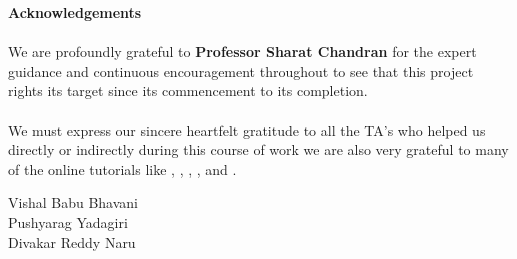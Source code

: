 \begin{center}
\thispagestyle{empty}
\LARGE{\textbf{Acknowledgements}}\\[1cm]
\end{center}
\linespread{1.13}
\large{\paragraph{}We are profoundly grateful to \textbf{Professor Sharat Chandran} for the expert guidance
and continuous encouragement throughout to see that this project rights its
target since its commencement to its completion.}
\large{\paragraph{}We must express our sincere heartfelt gratitude to all the TA's who helped us directly or indirectly during this course of work
we are also very grateful to many of the online tutorials like \cite{Tizen}, \cite{Box2DforFlashGames}, \cite{Box2Dlinks}, \cite{Sharelatexlinks}, \cite{csslinks}
and \cite{Bessierlinks}.
}

\begin{flushright}
{
Vishal Babu Bhavani\\
Pushyarag Yadagiri\\
Divakar Reddy Naru\\

}
\end{flushright}
\newpage
